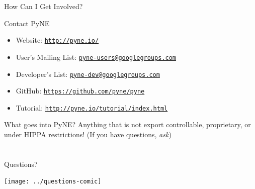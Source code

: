 \documentclass[xcolor=x11names,compress]{beamer}
\renewcommand{\(}{\begin{columns}}
\renewcommand{\)}{\end{columns}}
\newcommand{\<}[1]{\begin{column}{#1}}
\renewcommand{\>}{\end{column}}
\begin{document}
\begin{frame}{How Can I Get Involved?}

    \begin{block}{Contact PyNE}
    \begin{itemize}
      \item Website: \href{http://pyne.io/}{\texttt{http://pyne.io/}}

      \item User's Mailing List: \href{pyne-users@googlegroups.com}
      {\texttt{pyne-users@googlegroups.com}}

      \item Developer's List: \href{pyne-dev@googlegroups.com}
      {\texttt{pyne-dev@googlegroups.com}}

      \item GitHub: \href{https://github.com/pyne/pyne}
      {\texttt{https://github.com/pyne/pyne}}

      \item Tutorial: \href{http://pyne.io/tutorial/index.html}
      {\texttt{http://pyne.io/tutorial/index.html}}
    \end{itemize}
    \end{block}

    \vspace*{2 em}
    \begin{block}{What goes into PyNE?}
    Anything that is not export controllable, proprietary,
    or under HIPPA restrictions!  (If you have questions, \emph{ask})
    \end{block}

\end{frame}


\section*{}
\begin{frame}[fragile]{Questions?}

    \begin{center}
    \texttt{[image: ../questions-comic]}
    \end{center}

\end{frame}
\end{document}
